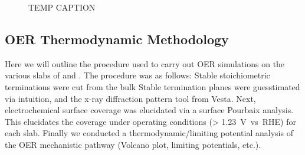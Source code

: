 \begin{figure}[!htb]
\centering
{}
\caption{\label{fig:bulk_pourbaix_wo_alpha}
TEMP CAPTION
}
\end{figure}





\subsection{OER Thermodynamic Methodology}  %
%
%
Here we will outline the procedure used to carry out OER simulations on the various slabs of \IrOtwo and \IrOthree.
%
The procedure was as follows:
%
Stable stoichiometric terminations were cut from the bulk
%
Stable termination planes were guesstimated via intuition, and the x-ray diffraction pattern tool from Vesta.
%
Next, electrochemical surface coverage was elucidated via a surface Pourbaix analysis.
%
This elucidates the coverage under operating conditions (> \SI{1.23}{\volt vs. RHE}) for each slab.
%
Finally we conducted a thermodynamic/limiting potential analysis of the OER mechanistic pathway (Volcano plot, limiting potentials, etc.).


